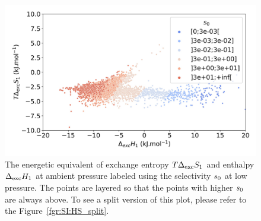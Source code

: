 \documentclass[main.tex]{subfiles}
\begin{document}
\begin{figure}[t]
\centering
  \includegraphics[width=0.6\linewidth]{figures/2-thermo/enthalpy_entropy_2080_s_0.jpg}
  \caption{The energetic equivalent of exchange entropy $T\Delta_{\text{exc}}S_{\text{1}}$ and enthalpy $\Delta_{\text{exc}}H_{\text{1}}$ at ambient pressure labeled using the selectivity $s_{\text{0}}$ at low pressure. The points are layered so that the points with higher $s_{\text{0}}$ are always above. To see a split version of this plot, please refer to the Figure~\ref{fgr:SI:HS_split}.}\label{fgr:HSplot_1}
\end{figure}
\end{document}
